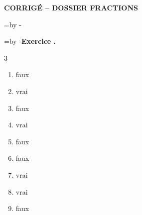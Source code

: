 \newpage

\providecommand{\Case}{\,\fbox{\rule{0pt}{2.1ex}\hspace{0.7cm}}\,}
\providecommand{\CaseC}{\,\fbox{\rule{0pt}{2.1ex}\hspace{0.4cm}}\,}
\providecommand{\FA}[2]{\dfrac{\vphantom{\CaseC}#1}{\vphantom{\CaseC}#2}}
\makeatletter
\newcommand{\NeedRoom}[1]{\par\begingroup\@tempdima=#1\relax\@tempdimb=\pagegoal\advance\@tempdimb by -\pagetotal\relax\ifdim\@tempdima>\@tempdimb\ifdim\pagetotal>0pt\newpage\fi\fi\endgroup}
\makeatother
\setcounter{cptexo}{0}
\newcommand{\ExoC}{\NeedRoom{9\baselineskip}\medskip\stepcounter{cptexo}\noindent\textbf{Exercice \thecptexo.}\par\smallskip}
\newcommand{\ChapC}[1]{\NeedRoom{12\baselineskip}\bigskip\noindent{\large\textcolor{themeNO!65!black}{\bfseries #1}}\par\nopagebreak\smallskip}
 
\clearpage
{}
\begin{center}
\begin{tcolorbox}[colback=themeNO!30,colframe=themeNO!65!black,halign=flush center,width=\textwidth,arc=3mm,boxsep=3mm]
{\Large\bfseries\color{themeNO!65!black} CORRIGÉ -- DOSSIER FRACTIONS}
\end{tcolorbox}
\end{center}

\ChapC{Vocabulaire}
\ExoC
\begin{multicols}{3}
\begin{enumerate}[leftmargin=*,align=parleft, label=\alph*), itemsep=6pt, topsep=2pt]
\item faux
\item vrai
\item faux
\item vrai
\item faux
\item faux %
\item vrai
\item vrai
\item faux
\end{enumerate}
\end{multicols}


